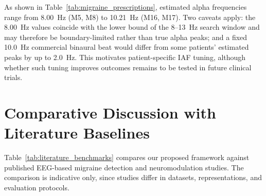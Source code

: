\documentclass[12pt, a4paper]{report}
\begin{document}
As shown in Table~\ref{tab:migraine_prescriptions}, estimated alpha frequencies range from 8.00~Hz (M5, M8) to 10.21~Hz (M16, M17). Two caveats apply: the 8.00~Hz values coincide with the lower bound of the 8--13~Hz search window and may therefore be boundary-limited rather than true alpha peaks; and a fixed 10.0~Hz commercial binaural beat would differ from some patients' estimated peaks by up to 2.0~Hz. This motivates patient-specific IAF tuning, although whether such tuning improves outcomes remains to be tested in future clinical trials.

\section{Comparative Discussion with Literature Baselines}
\label{sec:comparative_discussion}
Table~\ref{tab:literature_benchmarks} compares our proposed framework against published EEG-based migraine detection and neuromodulation studies. The comparison is indicative only, since studies differ in datasets, representations, and evaluation protocols.
\end{document}
